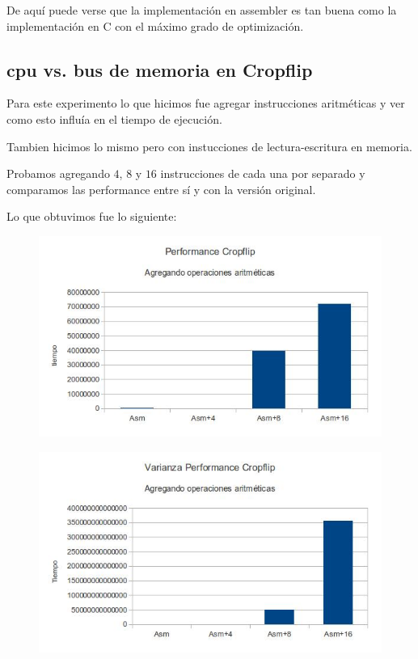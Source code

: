 \documentclass[a4paper]{article}
\begin{document}
De aquí puede verse que la implementación en assembler es tan buena como la implementación en C con el máximo grado de optimización.

\newpage

\subsection{cpu vs. bus de memoria en Cropflip}

Para este experimento lo que hicimos fue agregar instrucciones aritméticas y ver como esto influía en el tiempo de ejecución.

Tambien hicimos lo mismo pero con instucciones de lectura-escritura en memoria. 

Probamos agregando $4$, $8$ y $16$ instrucciones de cada una por separado y comparamos las performance entre sí y con la versión original.

Lo que obtuvimos fue lo siguiente:

\begin{figure}[h!]
  \begin{center}
  \includegraphics[scale=0.66]{Graficos1.5/crop/addsub/per.jpg}
  \label{nombreparareferenciar1}
  \end{center}
\end{figure}

\begin{figure}[h!]
  \begin{center}
  \includegraphics[scale=0.66]{Graficos1.5/crop/addsub/var.jpg}
  \label{nombreparareferenciar1}
  \end{center}
\end{figure}
\end{document}
